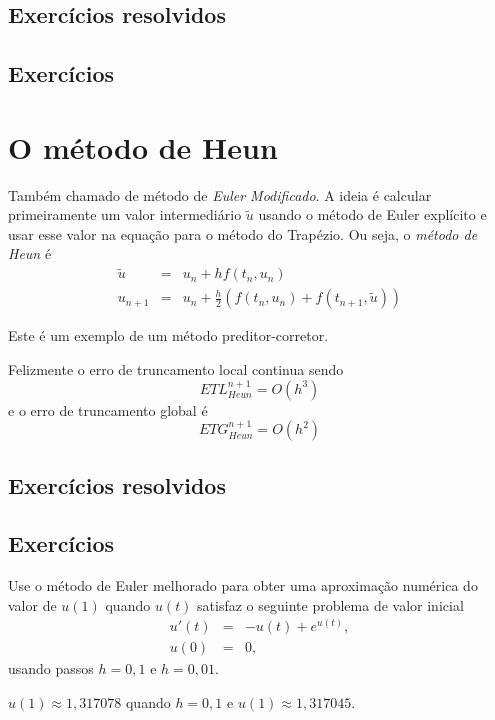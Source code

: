 \subsection*{Exercícios resolvidos}

\emconstrucao

\subsection*{Exercícios}

\emconstrucao


\section{O método de Heun}
Também chamado de método de \emph{Euler Modificado}. A ideia é calcular primeiramente um valor intermediário $\tilde{u}$ usando o método de Euler expl\'icito e usar esse valor na equação para o método do Trapézio. Ou seja, o \emph{método de Heun} é
\begin{eqnarray}
  \tilde{u} &=& u_n +   h f(t_n,u_n) \\
  u_{n+1}   &=& u_n +  \frac{h}{2} \left(f(t_n,u_n)+f(t_{n+1},\tilde{u})\right)
\end{eqnarray}

Este é um exemplo de um método preditor-corretor.

Felizmente o erro de truncamento local continua sendo
$$ETL_{Heun}^{n+1}= O(h^3)$$
e o erro de truncamento global é
$$ETG_{Heun}^{n+1}= O(h^2)$$


\subsection*{Exercícios resolvidos}

\emconstrucao

\subsection*{Exercícios}

\begin{exer} Use o método de Euler melhorado para obter uma aproximação numérica do valor de $u(1)$ quando $u(t)$ satisfaz o seguinte problema de valor inicial
\begin{eqnarray*}
 u'(t)&=&-u(t)+ e^{u(t)},\\
 u(0)&=&0,
\end{eqnarray*}
usando passos $h=0,1$ e $h=0,01$.
\end{exer}
\begin{resp}
 $u(1)\approx 1,317078$ quando $h=0,1$ e $u(1)\approx 1,317045$.
\end{resp}


